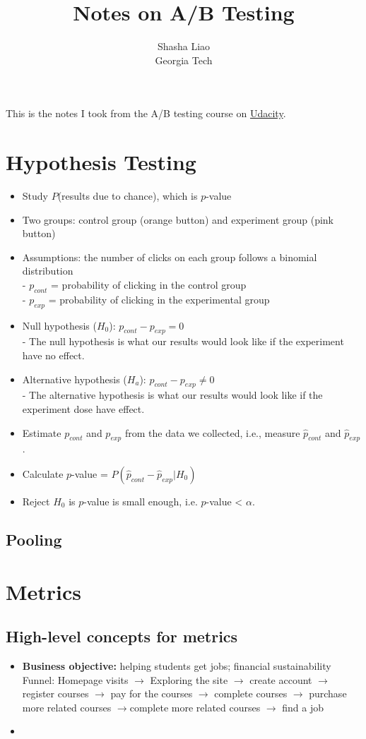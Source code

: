 \documentclass[twoside,12pt]{article}
\begin{document}
\title{Notes on A/B Testing}
\author {Shasha Liao \\ Georgia Tech}
\maketitle
This is the notes I took from the A/B testing course on \href{https://classroom.udacity.com/courses/ud257}{Udacity}.
\section{Hypothesis Testing}
\begin{itemize}
\item Study $P$(results due to chance), which is $p$-value
\item Two groups: control group (orange button) and experiment group (pink button)
\item Assumptions: the number of clicks on each group follows a binomial distribution \\
- $p_{cont}$ = probability of clicking in the control group \\
- $p_{exp}$ = probability of clicking in the experimental group 
\item Null hypothesis ($H_0$): $p_{cont} - p_{exp} = 0$ \\
- The null hypothesis is what our results would look like if the experiment have no effect.

\item Alternative hypothesis ($H_a$): $p_{cont} - p_{exp} \neq 0$\\
- The alternative hypothesis is what our results would look like if the experiment dose have effect.
\item Estimate $p_{cont}$ and $p_{exp}$ from the data we collected, i.e., measure $\hat{p}_{cont}$ and $\hat{p}_{exp}$.
\item Calculate $p$-value = $P(\hat{p}_{cont} - \hat{p}_{exp} | H_0 )$
\item Reject $H_0$ is $p$-value is small enough, i.e. $p$-value < $\alpha$.
\end{itemize}
\subsection{Pooling}
\section{Metrics}
\subsection{High-level concepts for metrics}
\begin{itemize}
\item \textbf{Business objective:} 
helping students get jobs; financial sustainability \\
Funnel: Homepage visits $\rightarrow$ Exploring the site $\rightarrow$  create account $\rightarrow$ register courses $\rightarrow$ pay for the courses $\rightarrow$ complete courses $\rightarrow$ purchase more related courses $\rightarrow$complete more related courses $\rightarrow$ find a job
\item 
\end{itemize}
\end{document}
